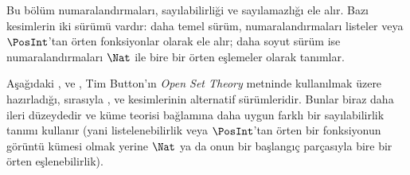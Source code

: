 


\begin{editorial}
Bu bölüm numaralandırmaları, sayılabilirliği ve sayılamazlığı ele alır.
Bazı kesimlerin iki sürümü vardır: daha temel sürüm, numaralandırmaları
listeler veya $\PosInt$'tan örten fonksiyonlar olarak ele alır; daha soyut
sürüm ise numaralandırmaları $\Nat$ ile bire bir örten eşlemeler olarak
tanımlar.
\end{editorial}











\begin{editorial}
Aşağıdaki ,
 ve , Tim
Button'ın \emph{Open Set Theory} metninde kullanılmak üzere hazırladığı,
sırasıyla ,  ve
 kesimlerinin alternatif sürümleridir. Bunlar biraz
daha ileri düzeydedir ve küme teorisi bağlamına daha uygun farklı bir
sayılabilirlik tanımı kullanır (yani listelenebilirlik veya $\PosInt$'tan örten
bir fonksiyonun görüntü kümesi olmak yerine $\Nat$ ya da onun bir başlangıç
parçasıyla bire bir örten eşlenebilirlik).
\end{editorial}


\OLEndChapterHook

